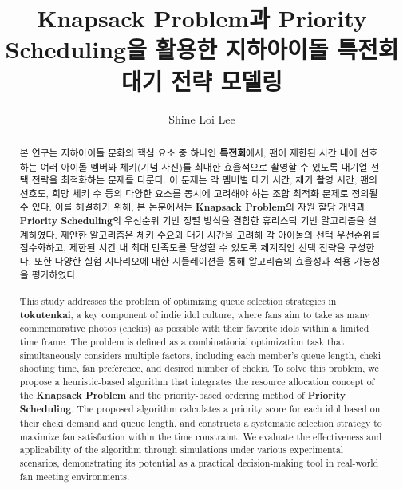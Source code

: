 \documentclass[12pt,hidelinks]{article}
\title{\textbf{\LARGE Knapsack Problem과 Priority Scheduling을 활용한 지하아이돌 특전회 대기 전략 모델링}}
\author{Shine Loi Lee}
\date{}
\begin{document}
\maketitle
\vspace{15em}
\thispagestyle{empty}

\begin{abstract}
\noindent 본 연구는 지하아이돌 문화의 핵심 요소 중 하나인 \textbf{특전회}에서, 팬이 제한된 시간 내에 선호하는 여러 아이돌 멤버와 체키(기념 사진)를 최대한 효율적으로 촬영할 수 있도록 대기열 선택 전략을 최적화하는 문제를 다룬다. 이 문제는 각 멤버별 대기 시간, 체키 촬영 시간, 팬의 선호도, 희망 체키 수 등의 다양한 요소를 동시에 고려해야 하는 조합 최적화 문제로 정의될 수 있다. 이를 해결하기 위해, 본 논문에서는 \textbf{Knapsack Problem}의 자원 할당 개념과 \textbf{Priority Scheduling}의 우선순위 기반 정렬 방식을 결합한 휴리스틱 기반 알고리즘을 설계하였다. 제안한 알고리즘은 체키 수요와 대기 시간을 고려해 각 아이돌의 선택 우선순위를 점수화하고, 제한된 시간 내 최대 만족도를 달성할 수 있도록 체계적인 선택 전략을 구성한다. 또한 다양한 실험 시나리오에 대한 시뮬레이션을 통해 알고리즘의 효율성과 적용 가능성을 평가하였다.
\\
\\
This study addresses the problem of optimizing queue selection strategies in \textbf{tokutenkai}, a key component of indie idol culture, where fans aim to take as many commemorative photos (chekis) as possible with their favorite idols within a limited time frame. The problem is defined as a combinatiorial optimization task that simultaneously considers multiple factors, including each member's queue length, cheki shooting time, fan preference, and desired number of chekis. To solve this problem, we propose a heuristic-based algorithm that integrates the resource allocation concept of the \textbf{Knapsack Problem} and the priority-based ordering method of \textbf{Priority Scheduling}. The proposed algorithm calculates a priority score for each idol based on their cheki demand and queue length, and constructs a systematic selection strategy to maximize fan satisfaction within the time constraint. We evaluate the effectiveness and applicability of the algorithm through simulations under various experimental scenarios, demonstrating its potential as a practical decision-making tool in real-world fan meeting environments.
\end{abstract}

\clearpage
\tableofcontents

\clearpage
\twocolumn
\end{document}
